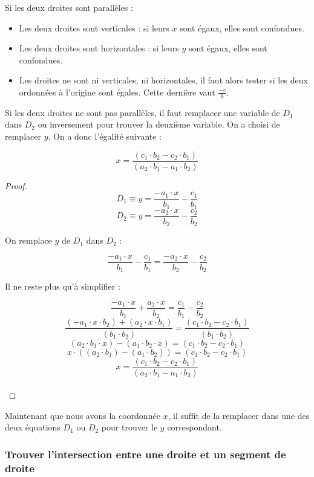 \documentclass[]{report}
\begin{document}
Si les deux droites sont parallèles : 
\begin{itemize}
    \item Les deux droites sont verticales : si leurs $x$ sont égaux, elles sont confondues.
    \item Les deux droites sont horizontales : si leurs $y$ sont égaux, elles sont confondues.
    \item Les droites ne sont ni verticales, ni horizontales, il faut alors tester si les deux
        ordonnées à l'origine sont égales. Cette dernière vaut $\frac{-c}{b}$. \\
\end{itemize}

Si les deux droites ne sont pas parallèles, il faut remplacer une variable de $D_1$ dans $D_2$
ou inversement pour trouver la deuxième variable. On a choisi de remplacer $y$.
On a donc l'égalité suivante : 

$$ x = \frac{(c_1 \cdot b_2 - c_2 \cdot b_1)}{(a_2 \cdot b_1 - a_1 \cdot b_2)} $$

\begin{proof}
$$ D_1 \equiv y = \frac{-a_1 \cdot x}{b_1} - \frac{c_1}{b_1} $$
$$ D_2 \equiv y = \frac{-a_2 \cdot x}{b_2} - \frac{c_2}{b_2} $$

On remplace $y$ de $D_1$ dans $D_2$ :

$$ \frac{-a_1 \cdot x}{b_1} - \frac{c_1}{b_1} = \frac{-a_2 \cdot x}{b_2} - \frac{c_2}{b_2} $$

Il ne reste plus qu'à simplifier :

$$ \frac{-a_1 \cdot x}{b_1} + \frac{a_2 \cdot x}{b_2} = \frac{c_1}{b_1} - \frac{c_2}{b_2} $$
$$ \frac{(-a_1 \cdot x \cdot b_2) + (a_2 \cdot x \cdot b_1)}{(b_1 \cdot b_2)} = \frac{(c_1 \cdot b_2 - c_2 \cdot b_1)}{(b_1 \cdot b_2)} $$
$$ (a_2 \cdot b_1 \cdot x) - (a_1 \cdot b_2 \cdot x) = (c_1 \cdot b_2 - c_2 \cdot b_1) $$
$$ x \cdot ((a_2 \cdot b_1) - (a_1 \cdot b_2)) = (c_1 \cdot b_2 - c_2 \cdot b_1) $$
$$ x = \frac{(c_1 \cdot b_2 - c_2 \cdot b_1)}{(a_2 \cdot b_1 - a_1 \cdot b_2)} $$ \\
\end{proof}

Maintenant que nous avons la coordonnée $x$, il suffit de la remplacer
dans une des deux équations $D_1$ ou $D_2$ pour trouver le $y$ 
correspondant.

\subsubsection{Trouver l'intersection entre une droite et un segment de droite}
\end{document}
